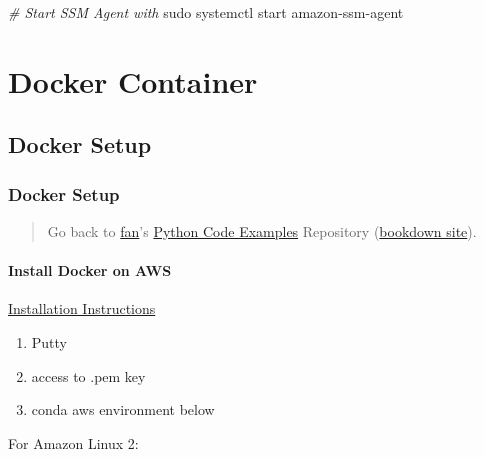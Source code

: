 \documentclass[
]{book}
\newenvironment{Shaded}{\begin{snugshade}}{\end{snugshade}}
\newcommand{\CommentTok}[1]{\textcolor[rgb]{0.56,0.35,0.01}{\textit{#1}}}
\newcommand{\FunctionTok}[1]{\textcolor[rgb]{0.00,0.00,0.00}{#1}}
\newcommand{\NormalTok}[1]{#1}
\providecommand{\tightlist}{%
  \setlength{\itemsep}{0pt}\setlength{\parskip}{0pt}}
\begin{document}
\begin{Shaded}
\begin{Highlighting}[]
\CommentTok{\# Start SSM Agent with}
\FunctionTok{sudo}\NormalTok{ systemctl start amazon{-}ssm{-}agent}
\end{Highlighting}
\end{Shaded}

\hypertarget{docker-container}{%
\chapter{Docker Container}\label{docker-container}}

\hypertarget{docker-setup}{%
\section{Docker Setup}\label{docker-setup}}

\hypertarget{docker-setup-1}{%
\subsection{Docker Setup}\label{docker-setup-1}}

\begin{quote}
Go back to \href{http://fanwangecon.github.io/}{fan}'s \href{https://fanwangecon.github.io/pyfan/}{Python Code Examples} Repository (\href{https://fanwangecon.github.io/pyfan/bookdown}{bookdown site}).
\end{quote}

\hypertarget{install-docker-on-aws}{%
\subsubsection{Install Docker on AWS}\label{install-docker-on-aws}}

\href{https://docs.aws.amazon.com/AmazonECS/latest/developerguide/docker-basics.html}{Installation Instructions}

\begin{enumerate}
\def\labelenumi{\arabic{enumi}.}
\tightlist
\item
  Putty
\item
  access to .pem key
\item
  conda aws environment below
\end{enumerate}

For Amazon Linux 2:
\end{document}
